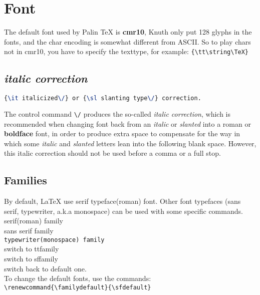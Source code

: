 \section{Font}
The default font used by Palin TeX is \textbf{cmr10}, Knuth only put 128 
glyphs in the fonts, and the char encoding is somewhat different from 
ASCII. So to play chars not in cmr10, you have to specify the texttype,
for example:
\verb|{\tt\string\TeX}|

\subsection{{\it italic correction}}
\begin{lstlisting}[language=TeX]
{\it italicized\/} or {\sl slanting type\/} correction.
\end{lstlisting}
The control command \verb|\/| produces the so-called {\it italic correction}, 
which is recommended when changing font back from an {\it italic} or 
{\sl slanted} into a {\rm roman} or {\bf boldface} font, in order to produce
extra space to compensate for the way in which some {\it italic} and 
{\sl slanted} letters lean into the following blank space. However, this
italic correction should not be used before a comma or a full stop.

\subsection{Families}
By default, \LaTeX{} use serif typeface(roman) font. Other font typefaces
(sans serif, typewriter, a.k.a monospace) can be used with some specific 
commands.
\textrm{serif(roman) family}	\\
\textsf{sans serif family}      \\
\texttt{typewriter(monospace) family}	\\
\ttfamily
switch to ttfamily  \\
\sffamily
switch to sffamily  \\
\rmfamily
switch back to default one. \\

To change the default fonts, use the commands:	\\
\verb|\renewcommand{\familydefault}{\sfdefault}|

